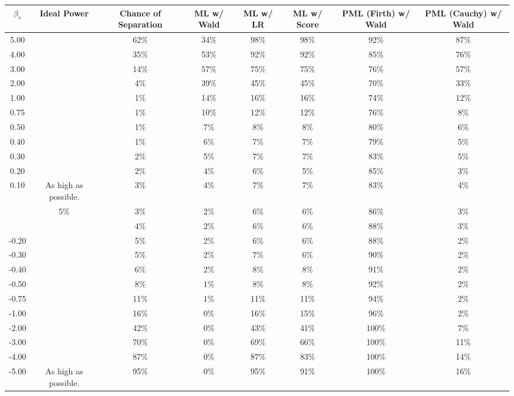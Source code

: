 
\begin{tabular}{>{}cccccccc}
\toprule
$\beta_s$ & Ideal Power & Chance of Separation & ML w/ Wald & ML w/ LR & ML w/ Score & PML (Firth) w/ Wald & PML (Cauchy) w/ Wald\\
\midrule
5.00 &  & 62\% & 34\% & 98\% & 98\% & 92\% & 87\%\\

4.00 &  & 35\% & 53\% & 92\% & 92\% & 85\% & 76\%\\

3.00 &  & 14\% & 57\% & 75\% & 75\% & 76\% & 57\%\\

2.00 &  & 4\% & 39\% & 45\% & 45\% & 70\% & 33\%\\

1.00 &  & 1\% & 14\% & 16\% & 16\% & 74\% & 12\%\\

0.75 &  & 1\% & 10\% & 12\% & 12\% & 76\% & 8\%\\

0.50 &  & 1\% & 7\% & 8\% & 8\% & 80\% & 6\%\\

0.40 &  & 1\% & 6\% & 7\% & 7\% & 79\% & 5\%\\

0.30 &  & 2\% & 5\% & 7\% & 7\% & 83\% & 5\%\\

0.20 &  & 2\% & 4\% & 6\% & 5\% & 85\% & 3\%\\

0.10 & \multirow{-11}{*}{\centering\arraybackslash As high as possible.} & 3\% & 4\% & 7\% & 7\% & 83\% & 4\%\\
\addlinespace
0.00 & 5\% & 3\% & 2\% & 6\% & 6\% & 86\% & 3\%\\
\addlinespace
-0.10 &  & 4\% & 2\% & 6\% & 6\% & 88\% & 3\%\\

-0.20 &  & 5\% & 2\% & 6\% & 6\% & 88\% & 2\%\\

-0.30 &  & 5\% & 2\% & 7\% & 6\% & 90\% & 2\%\\

-0.40 &  & 6\% & 2\% & 8\% & 8\% & 91\% & 2\%\\

-0.50 &  & 8\% & 1\% & 8\% & 8\% & 92\% & 2\%\\

-0.75 &  & 11\% & 1\% & 11\% & 11\% & 94\% & 2\%\\

-1.00 &  & 16\% & 0\% & 16\% & 15\% & 96\% & 2\%\\

-2.00 &  & 42\% & 0\% & 43\% & 41\% & 100\% & 7\%\\

-3.00 &  & 70\% & 0\% & 69\% & 66\% & 100\% & 11\%\\

-4.00 &  & 87\% & 0\% & 87\% & 83\% & 100\% & 14\%\\

-5.00 & \multirow{-11}{*}{\centering\arraybackslash As high as possible.} & 95\% & 0\% & 95\% & 91\% & 100\% & 16\%\\
\bottomrule
\end{tabular}